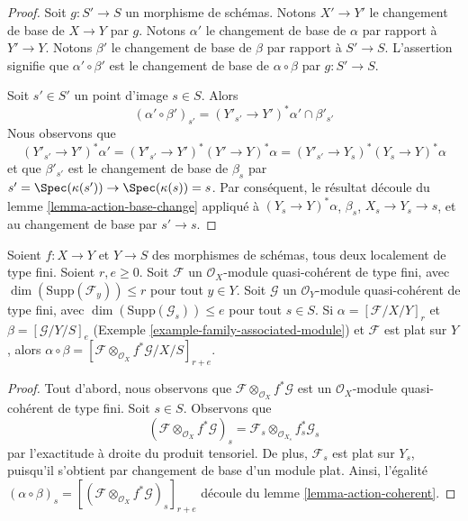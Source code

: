 \begin{proof} 
Soit  $g : S' \to S$  un morphisme de schémas. 
Notons  $X' \to Y'$  le changement de base de  $X \to Y$  par  $g$. Notons  
$\alpha'$  le changement de base de  $\alpha$  par rapport à  $Y' \to Y$.
 Notons  $\beta'$  le changement de base de  $\beta$  par rapport à  $S' \to S$.
 L'assertion signifie que $\alpha' \circ \beta'$  est le changement de base 
de  $\alpha \circ \beta$  par  $g : S' \to S$. 

\medskip\noindent
 Soit  $s' \in S'$  un point d'image  $s \in S$. Alors 
$$
(\alpha' \circ \beta')_{s'} = (Y'_{s'} \to Y')^*\alpha' \cap \beta'_{s'}
$$
 Nous observons que 
$$
(Y'_{s'} \to Y')^*\alpha' =
(Y'_{s'} \to Y')^*(Y' \to Y)^*\alpha =
(Y'_{s'} \to Y_s)^*(Y_s \to Y)^*\alpha
$$
 et que  $\beta'_{s'}$  est le changement de base de  $\beta_s$  par  
$s' = \Spec(\kappa(s')) \to \Spec(\kappa(s)) = s$.
 Par conséquent, le résultat découle du lemme \ref{lemma-action-base-change} 
appliqué à $(Y_s \to Y)^*\alpha$, $\beta_s$,  
$X_s \to Y_s \to s$, et au changement de base par  $s' \to s$. 
\end{proof} 

\begin{lemma} 
\label{lemma-construction-coherent} 
Soient  $f : X \to Y$  et  $Y \to S$  des morphismes de schémas, tous deux localement 
de type fini. Soient $r, e \geq 0$. Soit $\mathcal{F}$ un 
$\mathcal{O}_X$-module quasi-cohérent de type fini, avec  
$\dim(\text{Supp}(\mathcal{F}_y)) \leq r$  pour tout $y \in Y$. 
Soit  $\mathcal{G}$  un  $\mathcal{O}_Y$-module quasi-cohérent de 
type fini, avec  $\dim(\text{Supp}(\mathcal{G}_s)) \leq e$  pour tout  $s \in S$. 
Si  $\alpha = [\mathcal{F}/X/Y]_r$  et  $\beta = [\mathcal{G}/Y/S]_e$
 (Exemple  \ref{example-family-associated-module}) et  $\mathcal{F}$
  est plat sur  $Y$, alors $\alpha \circ \beta =
[\mathcal{F} \otimes_{\mathcal{O}_X} f^*\mathcal{G}/X/S]_{r + e}$. 
\end{lemma} 

\begin{proof} 
Tout d'abord, nous observons que  $\mathcal{F} \otimes_{\mathcal{O}_X} f^*\mathcal{G}$
  est un  $\mathcal{O}_X$-module quasi-cohérent de type fini. 
Soit  $s \in S$. Observons que 
$$
(\mathcal{F} \otimes_{\mathcal{O}_X} f^*\mathcal{G})_s =
\mathcal{F}_s \otimes_{\mathcal{O}_{X_s}} f_s^*\mathcal{G}_s
$$
 par l'exactitude à droite du produit tensoriel. De plus, $\mathcal{F}_s$
 est plat sur $Y_s$, puisqu'il s'obtient par changement de base d'un module plat. Ainsi, l'égalité 
$(\alpha \circ \beta)_s =
[(\mathcal{F} \otimes_{\mathcal{O}_X} f^*\mathcal{G})_s]_{r + e}$
 découle du lemme \ref{lemma-action-coherent}. 
\end{proof} 

